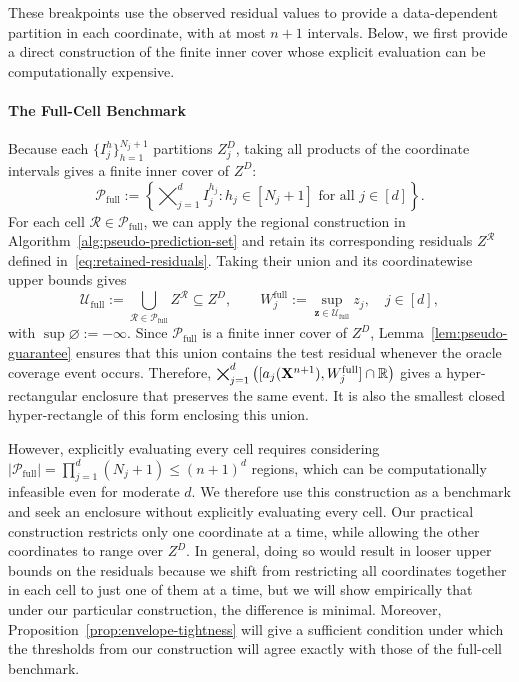 These breakpoints use the observed residual values to provide a data-dependent partition in each coordinate, with at most $n+1$ intervals. Below, we first provide a direct construction of the finite inner cover whose explicit evaluation can be computationally expensive.

\paragraph{The Full-Cell Benchmark}

Because each $\{I_j^h\}^{N_j+1}_{h=1}$ partitions $Z_j^D$, taking all products of the coordinate intervals gives a finite inner cover of $Z^D$:
\begin{equation}\label{eq:full-cell-partition}
\mathcal P_{\mathrm{full}}
:=
\left\{
\bigtimes_{j=1}^d I_j^{h_j}:
h_j\in[N_j+1]\text{ for all }j\in[d]
\right\}.
\end{equation}
For each cell $\mathcal{R} \in \mathcal P_{\mathrm{full}}$, we can apply the regional construction in Algorithm~\ref{alg:pseudo-prediction-set} and retain its corresponding residuals $Z^\mathcal{R}$ defined in~\eqref{eq:retained-residuals}. Taking their union and its coordinatewise upper bounds gives
\begin{equation}\label{eq:full-cell-benchmark}
\mathcal U_{\mathrm{full}}
:=
\bigcup_{\mathcal R\in\mathcal P_{\mathrm{full}}}Z^{\mathcal R}
\subseteq Z^D,
\qquad
W_j^{\mathrm{full}}
:=
\sup_{\mathbf z\in\mathcal U_{\mathrm{full}}}z_j,
\quad j\in[d],
\end{equation}
with $\sup\varnothing:=-\infty$. Since $\mathcal P_{\mathrm{full}}$ is a finite inner cover of $Z^D$, Lemma~\ref{lem:pseudo-guarantee} ensures that this union contains the test residual whenever the oracle coverage event occurs. Therefore, $\bigtimes_{j=1}^d
\left(
[a_j(\mathbf X^{n+1}),W_j^{\mathrm{full}}]\cap\mathbb{R}
\right)$
gives a hyper-rectangular enclosure that preserves the same event. It is also the smallest closed hyper-rectangle of this form enclosing this union.

However, explicitly evaluating every cell requires considering $|\mathcal P_{\mathrm{full}}|=\prod_{j=1}^d(N_j+1)\leq(n+1)^d$ regions, which can be computationally infeasible even for moderate $d$. We therefore use this construction as a benchmark and seek an enclosure without explicitly evaluating every cell. Our practical construction restricts only one coordinate at a time, while allowing the other coordinates to range over $Z^D$. In general, doing so would result in looser upper bounds on the residuals because we shift from restricting all coordinates together in each cell to just one of them at a time, but we will show empirically that under our particular construction, the difference is minimal. Moreover,
Proposition~\ref{prop:envelope-tightness} will give a sufficient condition under which the thresholds from our construction will agree exactly with those of the full-cell benchmark.

